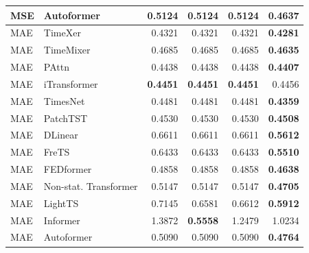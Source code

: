 \begin{longtable}{llrrrr}
MSE & Autoformer & 0.5124 & 0.5124 & 0.5124 & \textbf{0.4637} \\
\midrule
MAE & TimeXer & 0.4321 & 0.4321 & 0.4321 & \textbf{0.4281} \\
MAE & TimeMixer & 0.4685 & 0.4685 & 0.4685 & \textbf{0.4635} \\
MAE & PAttn & 0.4438 & 0.4438 & 0.4438 & \textbf{0.4407} \\
MAE & iTransformer & \textbf{0.4451} & \textbf{0.4451} & \textbf{0.4451} & 0.4456 \\
MAE & TimesNet & 0.4481 & 0.4481 & 0.4481 & \textbf{0.4359} \\
MAE & PatchTST & 0.4530 & 0.4530 & 0.4530 & \textbf{0.4508} \\
MAE & DLinear & 0.6611 & 0.6611 & 0.6611 & \textbf{0.5612} \\
MAE & FreTS & 0.6433 & 0.6433 & 0.6433 & \textbf{0.5510} \\
MAE & FEDformer & 0.4858 & 0.4858 & 0.4858 & \textbf{0.4638} \\
MAE & Non-stat. Transformer & 0.5147 & 0.5147 & 0.5147 & \textbf{0.4705} \\
MAE & LightTS & 0.7145 & 0.6581 & 0.6612 & \textbf{0.5912} \\
MAE & Informer & 1.3872 & \textbf{0.5558} & 1.2479 & 1.0234 \\
MAE & Autoformer & 0.5090 & 0.5090 & 0.5090 & \textbf{0.4764} \\
\end{longtable}
\endgroup


